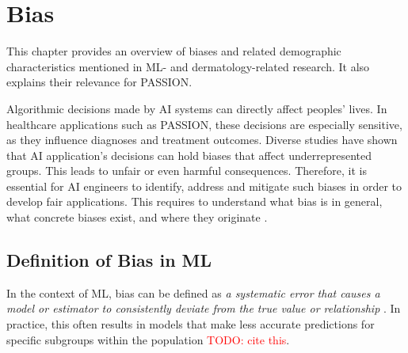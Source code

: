 \documentclass[12pt, a4paper, oneside]{book}   	%
\renewcommand{\todo}[1]{\textcolor{red}{TODO: #1}}
\newif\ifrawcitationactive
\newcommand{\rawcitationusedstart}{\color{violet}}
\newcommand{\rawcitationusedend}{%
	\ifrawcitationactive
	\color{purple}  %
	\else
	\color{black}  %
	\fi
}
\begin{document}
		
		\section{Bias}
		This chapter provides an overview of biases and related demographic characteristics mentioned in \gls{ML}- and dermatology-related research. It also explains their relevance for PASSION.
		
		Algorithmic decisions made by \gls{AI} systems can directly affect peoples' lives. In healthcare applications such as PASSION, these decisions are especially sensitive, as they influence diagnoses and treatment outcomes. Diverse studies have shown that \gls{AI} application's decisions can hold biases that affect underrepresented groups. This leads to unfair or even harmful consequences. Therefore, it is essential for \gls{AI} engineers to identify, address and mitigate such biases in order to develop fair applications. This requires to understand what bias is in general, what concrete biases exist, and where they originate \autocite{Mehrabi_2021}.
		
		

		
		\subsection{Definition of Bias in \gls{ML}}
		    In the context of \gls{ML}, bias can be defined as \textit{a systematic error that causes a model or estimator to consistently deviate from the true value or relationship} \autocite{Delgado-Rodriguez_2004, Taylor_2023}. In practice, this often results in models that make less accurate predictions for specific subgroups within the population \todo{cite this}.
		    
\end{document}
